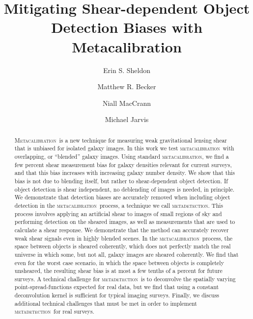 \documentclass[iop, twocolappendix, appendixfloats, numberedappendix, apj]{hackemulateapj}
\newcommand{\mcal}{\textsc{metacalibration}}
\newcommand{\mdet}{\textsc{metadetection}}
\newcommand{\Mcal}{\textsc{Metacalibration}}
\newcommand{\Mdet}{\textsc{Metadetection}}
\begin{document}


\title{Mitigating Shear-dependent Object Detection Biases with Metacalibration}

\author{Erin S. Sheldon}
\author{Matthew R. Becker}
\author{Niall MacCrann}
\author{Michael Jarvis}


\begin{abstract}

    \Mcal\ is a new technique for measuring weak gravitational lensing shear
    that is unbiased for isolated galaxy images.  In this work we test \mcal\
    with overlapping, or ``blended'' galaxy images.  Using standard \mcal, we
    find a few percent shear measurement bias for galaxy densities relevant for
    current surveys, and that this bias increases with increasing galaxy number
    density.  We show that this bias is not due to blending itself, but rather
    to shear-dependent object detection. If object detection is shear
    independent, no deblending of images is needed, in principle.  We
    demonstrate that detection biases are accurately removed when including
    object detection in the \mcal\ process, a technique we call \mdet.  This
    process involves applying an artificial shear to images of small regions of
    sky and performing detection on the sheared images, as well as measurements
    that are used to calculate a shear response.   We demonstrate that the
    method can accurately recover weak shear signals even in highly blended
    scenes.  In the \mcal\ process, the space between objects is sheared
    coherently, which does not perfectly match the real universe in which some,
    but not all, galaxy images are sheared coherently.  We find that even for
    the worst case scenario, in which the space between objects is completely
    unsheared, the resulting shear bias is at most a few tenths of a percent
    for future surveys.  A technical challenge for \mdet\ is to deconvolve the
    spatially varying point-spread-functions expected for real data, but we
    find that using a constant deconvolution kernel is sufficient for typical
    imaging surveys.  Finally, we discuss additional technical challenges that
    must be met in order to implement \mdet\ for real surveys.

\end{abstract}
\end{document}
